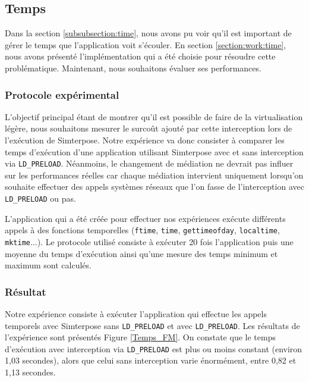 \subsection{Temps}
\label{section:temps}

Dans la section \ref{subsubsection:time}, nous avons pu voir qu'il est important de gérer le temps que l'application voit s'écouler. En section \ref{section:work:time}, nous avons présenté l'implémentation qui a été choisie pour résoudre cette problématique. Maintenant, nous souhaitons évaluer ses performances.

\subsubsection{Protocole expérimental}
L'objectif principal étant de montrer qu'il est possible de faire de la virtualisation légère, nous souhaitons mesurer le surcoût ajouté par cette interception lors de l'exécution de Simterpose. Notre expérience va donc consister à comparer les temps d'exécution d'une application utilisant Simterpose avec et sans interception via \texttt{LD\_PRELOAD}. Néanmoins, le changement de médiation ne devrait pas influer sur les performances réelles car chaque médiation intervient uniquement lorsqu'on souhaite effectuer des appels systèmes réseaux que l'on fasse de l'interception avec \texttt{LD\_PRELOAD} ou pas.

L'application qui a été créée pour effectuer nos expériences exécute différents appels à des fonctions temporelles (\texttt{ftime}, \texttt{time}, \texttt{gettimeofday}, \texttt{localtime}, \texttt{mktime}...). Le protocole utilisé consiste à exécuter 20 fois l'application puis une moyenne du temps d'exécution ainsi qu'une mesure des temps minimum et maximum sont calculés.

\subsubsection{Résultat}
 Notre expérience consiste à exécuter l'application qui effectue les appels temporels avec Simterpose sans \texttt{LD\_PRELOAD} et avec \texttt{LD\_PRELOAD}. Les résultats de l'expérience sont présentés Figure \ref{Temps_FM}. On constate que le temps d'exécution avec interception via \texttt{LD\_PRELOAD} est plus ou moins constant (environ 1,03 secondes), alors que celui sans interception varie énormément, entre 0,82 et 1,13 secondes. 

